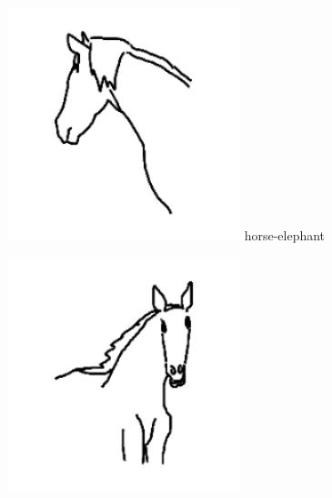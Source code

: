 \documentclass{article}
\begin{document}
\begin{center}
    \noindent
    \begin{minipage}{0.142\textwidth}
        \includegraphics[width=\linewidth]{./pic/misclassified_r4_p1_2723.jpg}
        horse-elephant
    \end{minipage}%
    \begin{minipage}{0.142\textwidth}
        \includegraphics[width=\linewidth]{./pic/misclassified_r4_p0_1641.jpg}

\end{minipage}
\end{center}
\end{document}
